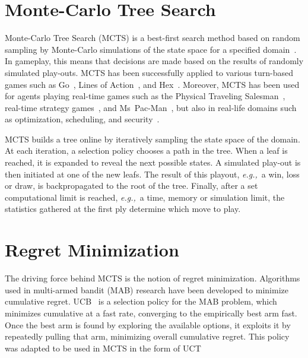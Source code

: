 \documentclass{kecsmstr}
\newcommand{\eg}{{\it e.g.,}~}
\begin{document}
\section{Monte-Carlo Tree Search}
Monte-Carlo Tree Search (MCTS) is a best-first search method based on random sampling by Monte-Carlo simulations of the state space for a specified domain~. In gameplay, this means that decisions are made based on the results of randomly simulated play-outs. MCTS has been successfully applied to various turn-based games such as Go~, Lines of Action~, and Hex~. Moreover, MCTS has been used for agents playing real-time games such as the Physical Traveling Salesman~, real-time strategy games~, and Ms~Pac-Man~, but also in real-life domains such as optimization, scheduling, and security~.

MCTS builds a tree online by iteratively sampling the state space of the domain. At each iteration, a selection policy chooses a path in the tree. When a leaf is reached, it is expanded to reveal the next possible states. A simulated play-out is then initiated at one of the new leafs. The result of this playout, \eg a win, loss or draw, is backpropagated to the root of the tree. Finally, after a set computational limit is reached, \eg a time, memory or simulation limit, the statistics gathered at the first ply determine which move to play.

\section{Regret Minimization}
The driving force behind MCTS is the notion of regret minimization. Algorithms used in multi-armed bandit (MAB) research have been developed to minimize cumulative regret. UCB~ is a selection policy for the MAB problem, which minimizes cumulative at a fast rate, converging to the empirically best arm fast. Once the best arm is found by exploring the available options, it exploits it by repeatedly pulling that arm, minimizing overall cumulative regret. This policy was adapted to be used in MCTS in the form of UCT~
\end{document}
